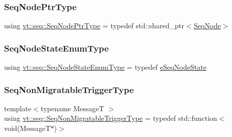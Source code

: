\subsubsection{\texorpdfstring{Seq\+Node\+Ptr\+Type}{SeqNodePtrType}}
{\footnotesize\ttfamily using \hyperlink{namespacevt_1_1seq_ae6a4874b585be0612aaca32ca6d2d191}{vt\+::seq\+::\+Seq\+Node\+Ptr\+Type} = typedef std\+::shared\+\_\+ptr$<$\hyperlink{structvt_1_1seq_1_1_seq_node}{Seq\+Node}$>$}

\mbox{\label{namespacevt_1_1seq_afe6bbf714bc77696f189e9321b981e46}} 
\subsubsection{\texorpdfstring{Seq\+Node\+State\+Enum\+Type}{SeqNodeStateEnumType}}
{\footnotesize\ttfamily using \hyperlink{namespacevt_1_1seq_ad7b0496818667d816e00f717491d3b92}{vt\+::seq\+::\+Seq\+Node\+State\+Enum\+Type} = typedef \hyperlink{namespacevt_1_1seq_ad7b0496818667d816e00f717491d3b92}{e\+Seq\+Node\+State}}

\mbox{\label{namespacevt_1_1seq_aa88b0d93284d188be39704024ab58b8f}} 
\subsubsection{\texorpdfstring{Seq\+Non\+Migratable\+Trigger\+Type}{SeqNonMigratableTriggerType}}
{\footnotesize\ttfamily template$<$typename MessageT $>$ \\
using \hyperlink{namespacevt_1_1seq_aa88b0d93284d188be39704024ab58b8f}{vt\+::seq\+::\+Seq\+Non\+Migratable\+Trigger\+Type} = typedef std\+::function$<$void(MessageT$\ast$)$>$}

\mbox{\label{namespacevt_1_1seq_a73ba0745e730a1837e22d831390d92e0}} 

